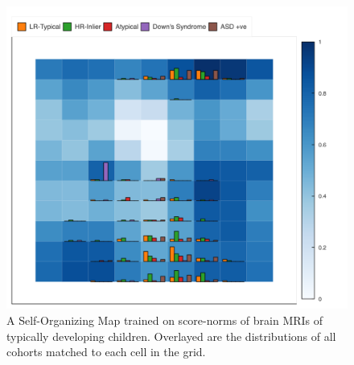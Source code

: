 \begin{figure}[tbhp]
\centering
\includegraphics[width=\linewidth]{figures/somgrid.png}
\caption{A Self-Organizing Map trained on score-norms of brain MRIs of typically developing children. Overlayed are the distributions of all cohorts matched to each cell in the grid.}
\label{fig:som-abcd}
\end{figure}





